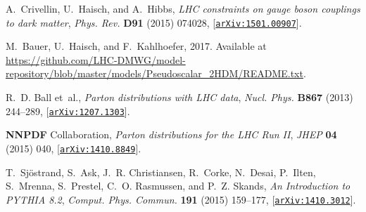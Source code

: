 \documentclass[review]{elsarticle}
\begin{document}
\begin{thebibliography}{100}
A.~Crivellin, U.~Haisch, and A.~Hibbs, {\it {LHC constraints on gauge boson
  couplings to dark matter}},  {\em Phys. Rev.} {\bf D91} (2015) 074028,
  [\href{http://arxiv.org/abs/1501.00907}{{\tt arXiv:1501.00907}}].

M.~Bauer, U.~Haisch, and F.~Kahlhoefer, 2017.
\newblock Available at
  \url{https://github.com/LHC-DMWG/model-repository/blob/master/models/Pseudoscalar_2HDM/README.txt}.

R.~D. Ball et~al., {\it {Parton distributions with LHC data}},  {\em Nucl.
  Phys.} {\bf B867} (2013) 244--289,
  [\href{http://arxiv.org/abs/1207.1303}{{\tt arXiv:1207.1303}}].

{\bf NNPDF} Collaboration,  {\it {Parton distributions for
  the LHC Run II}},  {\em JHEP} {\bf 04} (2015) 040,
  [\href{http://arxiv.org/abs/1410.8849}{{\tt arXiv:1410.8849}}].

T.~Sj{\"o}strand, S.~Ask, J.~R. Christiansen, R.~Corke, N.~Desai, P.~Ilten,
  S.~Mrenna, S.~Prestel, C.~O. Rasmussen, and P.~Z. Skands, {\it {An
  Introduction to PYTHIA 8.2}},  {\em Comput. Phys. Commun.} {\bf 191} (2015)
  159--177, [\href{http://arxiv.org/abs/1410.3012}{{\tt arXiv:1410.3012}}].

\end{thebibliography}\endgroup
\end{document}
